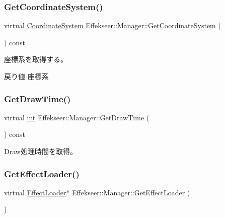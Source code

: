 \subsubsection{\texorpdfstring{Get\+Coordinate\+System()}{GetCoordinateSystem()}}
{\footnotesize\ttfamily virtual \mbox{\hyperlink{namespace_effekseer_ac8508f8823c5fcf36aac5d2ddee23765}{Coordinate\+System}} Effekseer\+::\+Manager\+::\+Get\+Coordinate\+System (\begin{DoxyParamCaption}{ }\end{DoxyParamCaption}) const\hspace{0.3cm}{\ttfamily [pure virtual]}}



座標系を取得する。 

\begin{DoxyReturn}{戻り値}
座標系 
\end{DoxyReturn}
\mbox{\label{class_effekseer_1_1_manager_a24c2805010a8fe5eca1115d48d8c5522}} 
\subsubsection{\texorpdfstring{Get\+Draw\+Time()}{GetDrawTime()}}
{\footnotesize\ttfamily virtual \mbox{\hyperlink{namespace_effekseer_ace0abf7c2e6947e519ebe8b54cbcc30a}{int}} Effekseer\+::\+Manager\+::\+Get\+Draw\+Time (\begin{DoxyParamCaption}{ }\end{DoxyParamCaption}) const\hspace{0.3cm}{\ttfamily [pure virtual]}}



Draw処理時間を取得。 

\mbox{\label{class_effekseer_1_1_manager_af757373ffa3cdbb1700b29c0903425d7}} 
\subsubsection{\texorpdfstring{Get\+Effect\+Loader()}{GetEffectLoader()}}
{\footnotesize\ttfamily virtual \mbox{\hyperlink{class_effekseer_1_1_effect_loader}{Effect\+Loader}}$\ast$ Effekseer\+::\+Manager\+::\+Get\+Effect\+Loader (\begin{DoxyParamCaption}{ }\end{DoxyParamCaption})\hspace{0.3cm}{\ttfamily [pure virtual]}}



